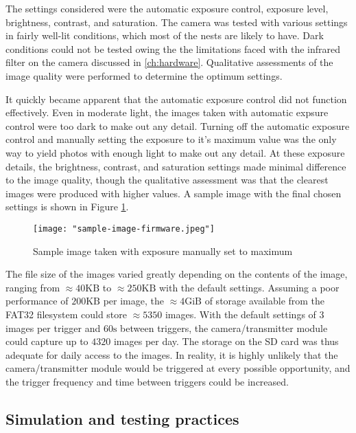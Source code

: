 \documentclass[class=report,11pt,crop=false]{standalone}
\begin{document}
The settings considered were the automatic exposure control, exposure level, brightness, contrast, and saturation. The camera was tested with various settings in fairly well-lit conditions, which most of the nests are likely to have. Dark conditions could not be tested owing the the limitations faced with the infrared filter on the camera discussed in \ref{ch:hardware}. Qualitative assessments of the image quality were performed to determine the optimum settings.

It quickly became apparent that the automatic exposure control did not function effectively. Even in moderate light, the images taken with automatic expsure control were too dark to make out any detail. Turning off the automatic exposure control and manually setting the exposure to it's maximum value was the only way to yield photos with enough light to make out any detail. At these exposure details, the brightness, contrast, and saturation settings made minimal difference to the image quality, though the qualitative assessment was that the clearest images were produced with higher values. A sample image with the final chosen settings is shown in Figure \ref{fig:sample-image-firmware}.

\begin{figure}[ht]
    \centering
    \texttt{[image: "sample-image-firmware.jpeg"]}
    \caption{Sample image taken with exposure manually set to maximum}
    \label{fig:sample-image-firmware}
\end{figure}

The file size of the images varied greatly depending on the contents of the image, ranging from $\approx 40 \mathrm{KB}$ to $\approx 250 \mathrm{KB}$ with the default settings. Assuming a poor performance of $200 \mathrm{KB}$ per image, the $\approx 4 \mathrm{GiB}$ of storage available from the FAT32 filesystem could store $\approx 5350$ images. With the default settings of $3$ images per trigger and $60\mathrm{s}$ between triggers, the camera/transmitter module could capture up to $4320$ images per day. The storage on the SD card was thus adequate for daily access to the images. In reality, it is highly unlikely that the camera/transmitter module would be triggered at every possible opportunity, and the trigger frequency and time between triggers could be increased.

\subsection{Simulation and testing practices}
\end{document}
